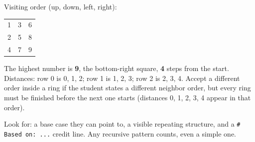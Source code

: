 \begin{answer}
Visiting order (up, down, left, right):
\begin{center}
\begin{tabular}{ccc}
1 & 3 & 6\\ 2 & 5 & 8\\ 4 & 7 & 9\\
\end{tabular}
\end{center}
The highest number is \textbf{9}, the bottom-right square, \textbf{4} steps from the start. Distances: row 0 is 0, 1, 2; row 1 is 1, 2, 3; row 2 is 2, 3, 4. Accept a different order inside a ring if the student states a different neighbor order, but every ring must be finished before the next one starts (distances 0, 1, 2, 3, 4 appear in that order).
\end{answer}

\begin{answer}
Look for: a base case they can point to, a visible repeating structure, and a \texttt{\# Based on: ...} credit line. Any recursive pattern counts, even a simple one.
\end{answer}

